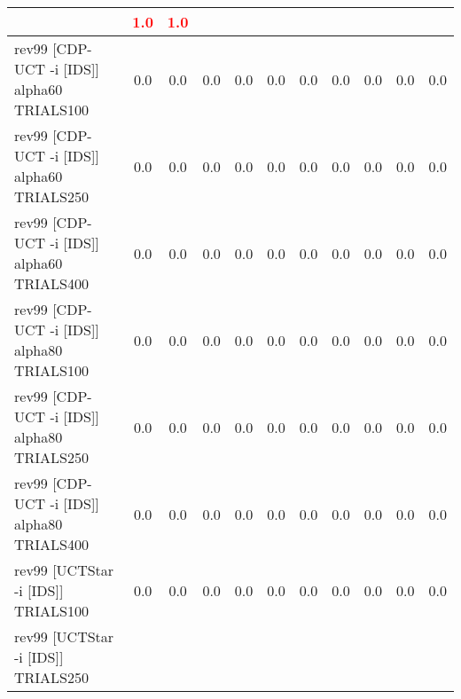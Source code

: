 \documentclass{article}
\begin{document}
\begin{tabular}{|l|r@{$\pm$}rr@{$\pm$}rr@{$\pm$}rr@{$\pm$}rr@{$\pm$}rr@{$\pm$}rr@{$\pm$}rr@{$\pm$}rr@{$\pm$}rr@{$\pm$}r|}
& \multicolumn{2}{c}{\textbf{\textcolor{red}{1.0}}}
& \multicolumn{2}{c|}{\textbf{\textcolor{red}{1.0}}}
\\
\hline
rev99 [CDP-UCT -i [IDS]] alpha60 TRIALS100
& \multicolumn{2}{c}{0.0}
& \multicolumn{2}{c}{0.0}
& \multicolumn{2}{c}{0.0}
& \multicolumn{2}{c}{0.0}
& \multicolumn{2}{c}{0.0}
& \multicolumn{2}{c}{0.0}
& \multicolumn{2}{c}{0.0}
& \multicolumn{2}{c}{0.0}
& \multicolumn{2}{c}{0.0}
& \multicolumn{2}{c|}{0.0}
\\
rev99 [CDP-UCT -i [IDS]] alpha60 TRIALS250
& \multicolumn{2}{c}{0.0}
& \multicolumn{2}{c}{0.0}
& \multicolumn{2}{c}{0.0}
& \multicolumn{2}{c}{0.0}
& \multicolumn{2}{c}{0.0}
& \multicolumn{2}{c}{0.0}
& \multicolumn{2}{c}{0.0}
& \multicolumn{2}{c}{0.0}
& \multicolumn{2}{c}{0.0}
& \multicolumn{2}{c|}{0.0}
\\
rev99 [CDP-UCT -i [IDS]] alpha60 TRIALS400
& \multicolumn{2}{c}{0.0}
& \multicolumn{2}{c}{0.0}
& \multicolumn{2}{c}{0.0}
& \multicolumn{2}{c}{0.0}
& \multicolumn{2}{c}{0.0}
& \multicolumn{2}{c}{0.0}
& \multicolumn{2}{c}{0.0}
& \multicolumn{2}{c}{0.0}
& \multicolumn{2}{c}{0.0}
& \multicolumn{2}{c|}{0.0}
\\
rev99 [CDP-UCT -i [IDS]] alpha80 TRIALS100
& \multicolumn{2}{c}{0.0}
& \multicolumn{2}{c}{0.0}
& \multicolumn{2}{c}{0.0}
& \multicolumn{2}{c}{0.0}
& \multicolumn{2}{c}{0.0}
& \multicolumn{2}{c}{0.0}
& \multicolumn{2}{c}{0.0}
& \multicolumn{2}{c}{0.0}
& \multicolumn{2}{c}{0.0}
& \multicolumn{2}{c|}{0.0}
\\
rev99 [CDP-UCT -i [IDS]] alpha80 TRIALS250
& \multicolumn{2}{c}{0.0}
& \multicolumn{2}{c}{0.0}
& \multicolumn{2}{c}{0.0}
& \multicolumn{2}{c}{0.0}
& \multicolumn{2}{c}{0.0}
& \multicolumn{2}{c}{0.0}
& \multicolumn{2}{c}{0.0}
& \multicolumn{2}{c}{0.0}
& \multicolumn{2}{c}{0.0}
& \multicolumn{2}{c|}{0.0}
\\
rev99 [CDP-UCT -i [IDS]] alpha80 TRIALS400
& \multicolumn{2}{c}{0.0}
& \multicolumn{2}{c}{0.0}
& \multicolumn{2}{c}{0.0}
& \multicolumn{2}{c}{0.0}
& \multicolumn{2}{c}{0.0}
& \multicolumn{2}{c}{0.0}
& \multicolumn{2}{c}{0.0}
& \multicolumn{2}{c}{0.0}
& \multicolumn{2}{c}{0.0}
& \multicolumn{2}{c|}{0.0}
\\
rev99 [UCTStar -i [IDS]] TRIALS100
& \multicolumn{2}{c}{0.0}
& \multicolumn{2}{c}{0.0}
& \multicolumn{2}{c}{0.0}
& \multicolumn{2}{c}{0.0}
& \multicolumn{2}{c}{0.0}
& \multicolumn{2}{c}{0.0}
& \multicolumn{2}{c}{0.0}
& \multicolumn{2}{c}{0.0}
& \multicolumn{2}{c}{0.0}
& \multicolumn{2}{c|}{0.0}
\\
rev99 [UCTStar -i [IDS]] TRIALS250

\end{tabular}
\end{document}
